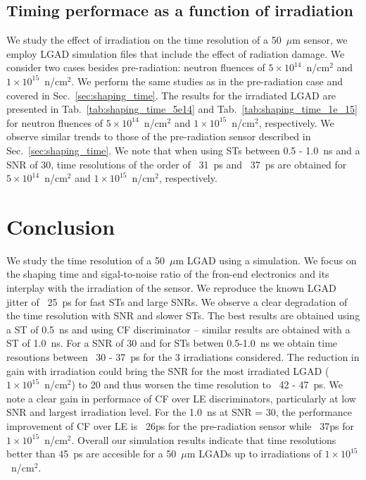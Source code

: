 \documentclass[preprint,1p]{elsarticle}
\begin{document}
\subsection{Timing performace as a function of irradiation}\label{sec:rad_tolerance}
We study the effect of irradiation on the time resolution of a 50~$\mu$m sensor, we employ LGAD simulation files that include
the effect of radiation damage. We consider two cases besides pre-radiation: neutron fluences of
 $5\times 10^{14}$~n/cm$^2$ and $1\times 10^{15}$~n/cm$^2$. We perform the same studies as in the pre-radiation case and covered in
 Sec.~\ref{sec:shaping_time}. The results for the irradiated LGAD are presented in Tab.~\ref{tab:shaping_time_5e14} and
 Tab.~\ref{tab:shaping_time_1e_15} for neutron fluences of
  $5\times 10^{14}$~n/cm$^2$ and $1\times 10^{15}$~n/cm$^2$, respectively.
  We observe similar trends to those of the pre-radiation sensor described in
   Sec.~\ref{sec:shaping_time}. We note that when using STs between 0.5 - 1.0~\si{ns} and a SNR of 30, time resolutions of the order
   of ~31~\si{ps} and ~37~\si{ps} are obtained for $5\times 10^{14}$~n/cm$^2$ and $1\times 10^{15}$~n/cm$^2$, respectively.

\section{Conclusion}\label{sec:conclusion}

We study the time resolution of a 50~$\mu$m LGAD using a simulation. We focus on the shaping time and sigal-to-noise ratio
of the fron-end electronics and its interplay with the irradiation of the sensor. We reproduce the known LGAD jitter of ~25~\si{ps}
for fast STs and large SNRs. We observe a clear degradation of the time resolution with SNR and slower STs. The best results are
obtained using a ST of 0.5~\si{ns} and using CF discriminator -- similar results are obtained with a ST of 1.0~\si{ns}. For a SNR of 30
and for STs betwen 0.5-1.0~\si{ns} we obtain time resoutions between ~30 - 37~\si{ps} for the 3 irradiations considered. The
reduction in gain with irradiation could bring the SNR for the most irradiated LGAD ($1\times 10^{15}$~n/cm$^2$) to 20 and thus
worsen the time resolution to ~42 - 47~\si{ps}. We note a clear gain in performace of CF over LE discriminators, particularly at
low SNR and largest irradiation level. For the 1.0~\si{ns} at SNR = 30, the performance improvement of CF over LE
is ~26\si{ps} for the pre-radiation sensor while ~37\si{ps} for $1\times 10^{15}$~n/cm$^2$. Overall our simulation results indicate
that time resolutions better than 45~\si{ps} are accesible for a 50~$\mu$m LGADs up to irradiations of $1\times 10^{15}$~n/cm$^2$.
\end{document}
